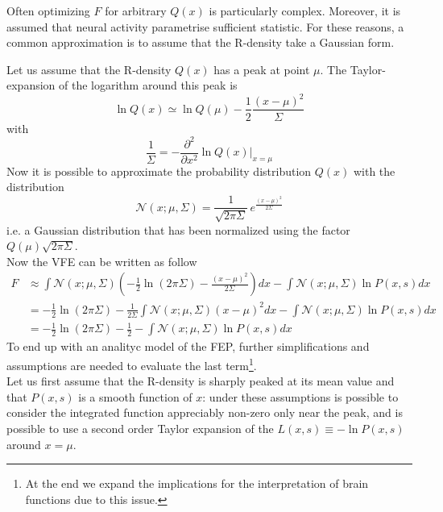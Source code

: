 \documentclass[a4paper, 10pt]{article}
\begin{document}
Often optimizing $F$ for arbitrary $Q(x)$ is particularly complex. Moreover, it is assumed that neural activity parametrise sufficient statistic.
For these reasons, a common approximation is to assume that the R-density take a Gaussian form. 

Let us assume that the R-density $Q(x)$ has a peak at point $\mu$. The Taylor-expansion of the logarithm around this peak is
\begin{equation}
\ln Q(x) \simeq \ln Q(\mu) - \frac{1}{2} \frac{(x-\mu)^2}{\Sigma} 
\end{equation}
with
\begin{equation}
\frac{1}{\Sigma} = - \frac{\partial^{2} }{\partial x^2} \ln Q(x) \bigg\rvert_{x=\mu} 
\end{equation}
Now it is possible to approximate the probability distribution $Q(x)$ with the distribution
\begin{equation}
\mathcal{N}(x;\mu, \Sigma) = \frac{1}{\sqrt{ 2 \pi \Sigma}} \, e^{\frac{(x-\mu)^2}{2 \Sigma}}
\end{equation}
i.e. a Gaussian distribution that has been normalized using the factor $Q(\mu) \sqrt{2 \pi \Sigma }$.\\
Now the VFE can be written as follow
\begin{equation}
\begin{split}
F   & \approx \int \mathcal{N}(x;\mu,\Sigma) (-\frac{1}{2} \ln (2 \pi \Sigma) - \frac{(x-\mu)^2}{2 \Sigma} ) d x - \int \mathcal{N}(x;\mu,\Sigma) \ln P(x,s) d x \\
    & = -\frac{1}{2} \ln (2 \pi \Sigma) - \frac{1}{2 \Sigma} \int \mathcal{N}(x;\mu,\Sigma) (x-\mu)^2  d x - \int \mathcal{N}(x;\mu,\Sigma) \ln P(x,s) d x \\
    & = -\frac{1}{2} \ln (2 \pi \Sigma) - \frac{1}{2} - \int \mathcal{N}(x;\mu,\Sigma) \ln P(x,s) d x
\end{split}
\end{equation}
To end up with an analityc model of the FEP, further simplifications and assumptions are needed to evaluate the last term\footnote{At the end we expand the implications for the interpretation of brain functions due to this issue.}. \\
Let us first assume that the R-density is sharply peaked at its mean value and that $P(x,s)$ is a smooth function of $x$: under these assumptions is possible to consider the integrated function appreciably non-zero only near the peak, and is possible to use a second order Taylor expansion of the $L(x,s) \equiv - \ln P(x,s)$ around $x=\mu$.
\end{document}
